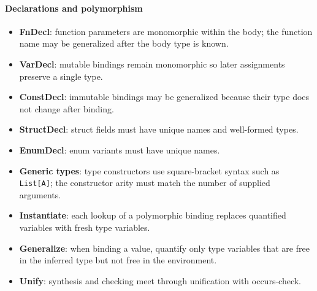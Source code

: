 \documentclass[11pt]{article}
\newcommand{\syn}{\Rightarrow} %
\newcommand{\chk}{\Leftarrow} %
\begin{document}
\paragraph{Declarations and polymorphism}

\begin{itemize}
    \item \textbf{FnDecl}: function parameters are monomorphic within the body; the function name may be generalized after the body type is known.
    \item \textbf{VarDecl}: mutable bindings remain monomorphic so later assignments preserve a single type.
    \item \textbf{ConstDecl}: immutable bindings may be generalized because their type does not change after binding.
    \item \textbf{StructDecl}: struct fields must have unique names and well-formed types.
    \item \textbf{EnumDecl}: enum variants must have unique names.
    \item \textbf{Generic types}: type constructors use square-bracket syntax such as \texttt{List[A]}; the constructor arity must match the number of supplied arguments.
    \item \textbf{Instantiate}: each lookup of a polymorphic binding replaces quantified variables with fresh type variables.
    \item \textbf{Generalize}: when binding a value, quantify only type variables that are free in the inferred type but not free in the environment.
    \item \textbf{Unify}: synthesis and checking meet through unification with occurs-check.
\end{itemize}
\end{document}
